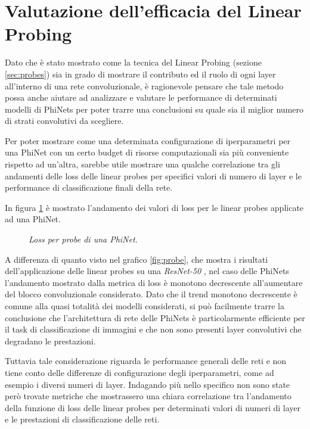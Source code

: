 \section{Valutazione dell'efficacia del Linear Probing}

Dato che è stato mostrato come la tecnica del Linear Probing (sezione \ref{sec:probes}) sia in grado di mostrare il contributo ed il ruolo di ogni layer all'interno di una rete convoluzionale, è ragionevole pensare che tale metodo possa anche aiutare ad analizzare e valutare le performance di determinati modelli di PhiNets per poter trarre una conclusioni su quale sia il miglior numero di strati convolutivi da scegliere.

Per poter mostrare come una determinata configurazione di iperparametri per una PhiNet con un certo budget di risorse computazionali sia più conveniente rispetto ad un'altra, sarebbe utile mostrare una qualche correlazione tra gli andamenti delle loss delle linear probes per specifici valori di numero di layer e le performance di classificazione finali della rete. 

In figura \ref{fig:probe_phinets} è mostrato l'andamento dei valori di loss per le linear probes applicate ad una PhiNet.

\begin{figure}[h!]
    \centering
    \caption{\textit{Loss per probe di una PhiNet}.}
    \label{fig:probe_phinets}
\end{figure}

A differenza di quanto visto nel grafico \ref{fig:probe}, che mostra i risultati dell'applicazione delle linear probes su una \textit{ResNet-50} \cite{ResNet}, nel caso delle PhiNets l'andamento mostrato dalla metrica di loss è monotono decrescente all'aumentare del blocco convoluzionale considerato. Dato che il trend monotono decrescente è comune alla quasi totalità dei modelli considerati, si può facilmente trarre la conclusione che l'architettura di rete delle PhiNets è particolarmente efficiente per il task di classificazione di immagini e che non sono presenti layer convolutivi che degradano le prestazioni. 

Tuttavia tale considerazione riguarda le performance generali delle reti e non tiene conto delle differenze di configurazione degli iperparametri, come ad esempio i diversi numeri di layer. Indagando più nello specifico non sono state però trovate metriche che mostrassero una chiara correlazione tra l'andamento della funzione di loss delle linear probes per determinati valori di numeri di layer e le prestazioni di classificazione delle reti.

